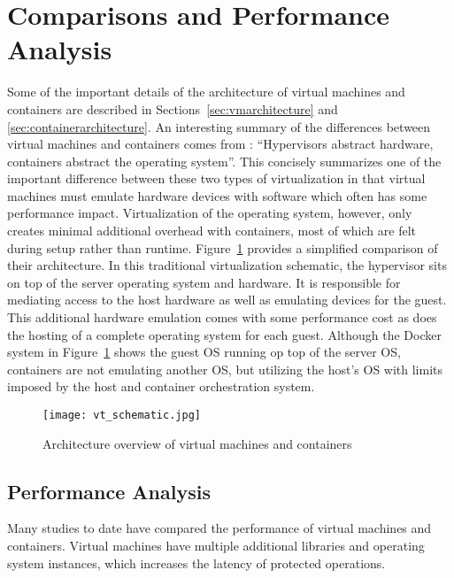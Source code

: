 \section{Comparisons and Performance Analysis} %
\label{sec:comparisons_performance_analysis}
Some of the important details of the architecture of virtual machines and containers are described in Sections~\ref{sec:vmarchitecture} and \ref{sec:containerarchitecture}.
An interesting summary of the differences between virtual machines and containers comes from \autocite{morabitohypervisors}: ``Hypervisors abstract hardware, containers abstract the operating system''. 
This concisely summarizes one of the important difference between these two types of virtualization in that virtual machines must emulate hardware devices with software which often has some performance impact.  
Virtualization of the operating system, however, only creates minimal additional overhead with containers, most of which are felt during setup rather than runtime.
Figure~\ref{fig:vtschematic} provides a simplified comparison of their architecture. 
In this traditional virtualization schematic, the hypervisor sits on top of the server operating system and hardware.
It is responsible for mediating access to the host hardware as well as emulating devices for the guest.  
This additional hardware emulation comes with some performance cost as does the hosting of a complete operating system for each guest.  
Although the Docker system in Figure~\ref{fig:vtschematic} shows the guest OS running op top of the server OS, containers are not emulating another OS, but utilizing the host's OS with limits imposed by the host and container orchestration system.

\begin{figure}
    \centering
    \texttt{[image: vt\_schematic.jpg]}
    \caption{Architecture overview of virtual machines and containers \autocite{whatisdocker}}
    \label{fig:vtschematic}
\end{figure}

\subsection{Performance Analysis} %
\label{sub:performanceanalysis}

Many studies to date have compared the performance of virtual machines and containers.
Virtual machines have multiple additional libraries and operating system instances, which increases the latency of protected operations.  

